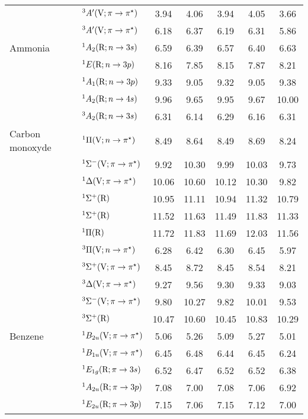 \begin{tabular}{p{3.5cm}p{3.3cm}c|cccc}
        &$^3A^\prime (\mathrm{V}; \pi \rightarrow \pi^\star)$					& 3.94	&4.06	&3.94	&4.05	&3.66\\
        &$^3A^\prime (\mathrm{V}; \pi \rightarrow \pi^\star)$					& 6.18	&6.37	&6.19	&6.31	&5.86\\
  Ammonia		&$^1A_2 (\mathrm{R};n \rightarrow 3s)$ 					&6.59	&6.39	&6.57	&6.40	&6.63	 \\
        &$^1E (\mathrm{R};n \rightarrow 3p)$ 					&8.16	&7.85	&8.15	&7.87	&8.21 	\\
        &$^1A_1 (\mathrm{R};n \rightarrow 3p)$ 					&9.33	&9.05	&9.32	&9.05	&9.38 	\\
        &$^1A_2 (\mathrm{R};n \rightarrow 4s)$ 					&9.96	&9.65	&9.95	&9.67	&10.00	 \\
        &$^3A_2 (\mathrm{R};n \rightarrow 3s)$ 					&6.31	&6.14	&6.29	&6.16	&6.31 	\\
  Carbon monoxyde	&$^1\Pi (\mathrm{V};n \rightarrow \pi^\star)$ 				& 8.49	&8.64	&8.49	&8.69	&8.24	 \\
        &$^1\Sigma^- (\mathrm{V};\pi \rightarrow \pi^\star)$				& 9.92	&10.30	&9.99	&10.03	&9.73	\\
        &$^1\Delta (\mathrm{V};\pi \rightarrow \pi^\star)$ 				&10.06	&10.60	&10.12	&10.30	&9.82	\\
        &$^1\Sigma^+ (\mathrm{R})$ 					&10.95	&11.11	&10.94	&11.32	&10.79	\\
        &$^1\Sigma^+ (\mathrm{R})$ 					&11.52	&11.63	&11.49	&11.83	&11.33	\\
        &$^1\Pi (\mathrm{R})$							&11.72	&11.83	&11.69	&12.03	&11.56	\\
        &$^3\Pi (\mathrm{V};n \rightarrow \pi^\star)$ 					& 6.28	&6.42	&6.30	&6.45	&5.97	\\
        &$^3\Sigma^+ (\mathrm{V};\pi \rightarrow \pi^\star)$			& 8.45	&8.72	&8.45	&8.54	&8.21	\\
        &$^3\Delta (\mathrm{V};\pi \rightarrow \pi^\star)$ 				& 9.27	&9.56	&9.30	&9.33	&9.03	\\
        &$^3\Sigma^- (\mathrm{V};\pi \rightarrow \pi^\star)$				& 9.80	&10.27	&9.82	&10.01	&9.53	\\
        &$^3\Sigma^+ (\mathrm{R})$ 					& 10.47	&10.60	&10.45	&10.83	&10.29	\\
  Benzene		&$^1B_{2u} (\mathrm{V}; \pi \rightarrow \pi^\star)$				& 5.06	&5.26	&5.09	&5.27	&5.01\\
        &$^1B_{1u} (\mathrm{V}; \pi \rightarrow \pi^\star)$				& 6.45	&6.48	&6.44	&6.45	&6.24\\
        &$^1E_{1g} (\mathrm{R}; \pi \rightarrow 3s)$				& 6.52	&6.47	&6.52	&6.52	&6.38\\
        &$^1A_{2u}  (\mathrm{R}; \pi \rightarrow 3p)$				& 7.08	&7.00	&7.08	&7.06	&6.92\\
        &$^1E_{2u}  (\mathrm{R}; \pi \rightarrow 3p)$				& 7.15	&7.06	&7.15	&7.12	&7.00\\

\end{tabular}
